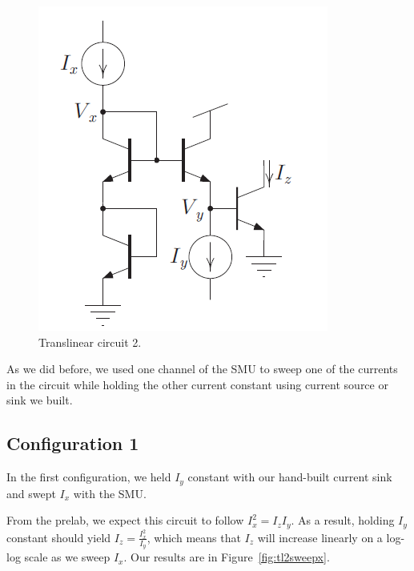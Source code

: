 \documentclass{article}
\begin{document}
\begin{figure}[H]
\begin{center}
\includegraphics[scale=.5]{tl2.png}
\caption{Translinear circuit 2.}
\label{fig:tl2}
\end{center}
\end{figure}

As we did before, we used one channel of the SMU to sweep one of the currents in the circuit while holding the other current constant using current source or sink we built.

\subsection*{Configuration 1}

In the first configuration, we held $I_y$ constant with our hand-built current sink and swept $I_x$ with the SMU.  

From the prelab, we expect this circuit to follow $I_x ^2 = I_z I_y$.  As a result, holding $I_y$ constant should yield $I_z = \frac{I_x^2}{I_y}$, which means that $I_z$ will increase linearly on a log-log scale as we sweep $I_x$.  Our results are in Figure~\ref{fig:tl2sweepx}.
\end{document}
